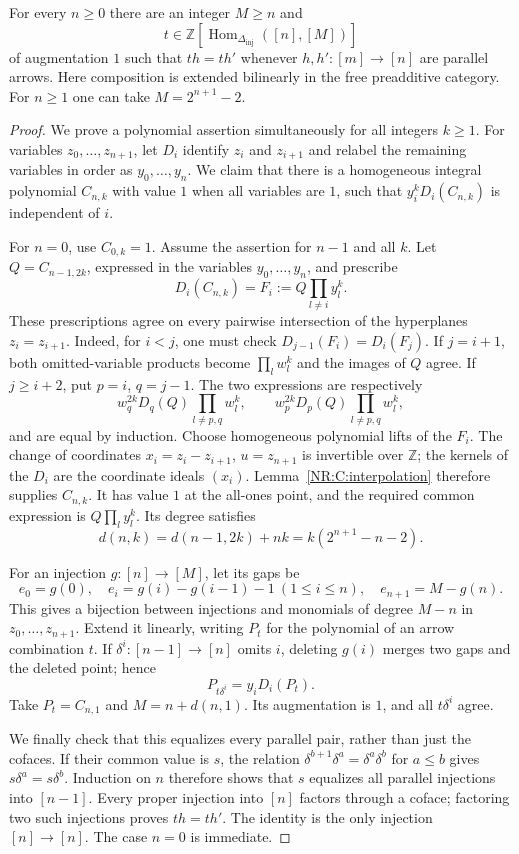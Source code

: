 \begin{nrlemma}\label{NR:C:affine-cones}
For every $n\geq0$ there are an integer $M\geq n$ and
\[
 t\in\mathbb Z[\operatorname{Hom}_{\Delta_{\mathrm{inj}}}([n],[M])]
\]
of augmentation $1$ such that $th=th'$ whenever $h,h':[m]\to[n]$ are parallel arrows. Here composition is extended bilinearly in the free preadditive category. For $n\geq1$ one can take $M=2^{n+1}-2$.
\end{nrlemma}
\begin{proof}
We prove a polynomial assertion simultaneously for all integers $k\geq1$. For variables $z_0,\ldots,z_{n+1}$, let $D_i$ identify $z_i$ and $z_{i+1}$ and relabel the remaining variables in order as $y_0,\ldots,y_n$. We claim that there is a homogeneous integral polynomial $C_{n,k}$ with value $1$ when all variables are $1$, such that $y_i^kD_i(C_{n,k})$ is independent of $i$.

For $n=0$, use $C_{0,k}=1$. Assume the assertion for $n-1$ and all $k$. Let $Q=C_{n-1,2k}$, expressed in the variables $y_0,\ldots,y_n$, and prescribe
\[
 D_i(C_{n,k})=F_i:=Q\prod_{l\ne i}y_l^k.
\]
These prescriptions agree on every pairwise intersection of the hyperplanes $z_i=z_{i+1}$. Indeed, for $i<j$, one must check $D_{j-1}(F_i)=D_i(F_j)$. If $j=i+1$, both omitted-variable products become $\prod_lw_l^k$ and the images of $Q$ agree. If $j\geq i+2$, put $p=i$, $q=j-1$. The two expressions are respectively
\[
 w_q^{2k}D_q(Q)\prod_{l\ne p,q}w_l^k,
 \qquad
 w_p^{2k}D_p(Q)\prod_{l\ne p,q}w_l^k,
\]
and are equal by induction. Choose homogeneous polynomial lifts of the $F_i$. The change of coordinates
$x_i=z_i-z_{i+1}$, $u=z_{n+1}$ is invertible over $\mathbb Z$; the kernels of the $D_i$ are the coordinate ideals $(x_i)$. Lemma~\ref{NR:C:interpolation} therefore supplies $C_{n,k}$. It has value $1$ at the all-ones point, and the required common expression is $Q\prod_l y_l^k$. Its degree satisfies
\[
 d(n,k)=d(n-1,2k)+nk=k(2^{n+1}-n-2).
\]

For an injection $g:[n]\to[M]$, let its gaps be
\[
 e_0=g(0),\quad e_i=g(i)-g(i-1)-1\ (1\leq i\leq n),
 \quad e_{n+1}=M-g(n).
\]
This gives a bijection between injections and monomials of degree $M-n$ in $z_0,\ldots,z_{n+1}$. Extend it linearly, writing $P_t$ for the polynomial of an arrow combination $t$. If $\delta^i:[n-1]\to[n]$ omits $i$, deleting $g(i)$ merges two gaps and the deleted point; hence
\[
 P_{t\delta^i}=y_iD_i(P_t).
\]
Take $P_t=C_{n,1}$ and $M=n+d(n,1)$. Its augmentation is $1$, and all $t\delta^i$ agree.

We finally check that this equalizes every parallel pair, rather than just the cofaces. If their common value is $s$, the relation
$\delta^{b+1}\delta^a=\delta^a\delta^b$ for $a\leq b$ gives $s\delta^a=s\delta^b$. Induction on $n$ therefore shows that $s$ equalizes all parallel injections into $[n-1]$. Every proper injection into $[n]$ factors through a coface; factoring two such injections proves $th=th'$. The identity is the only injection $[n]\to[n]$. The case $n=0$ is immediate.
\end{proof}

